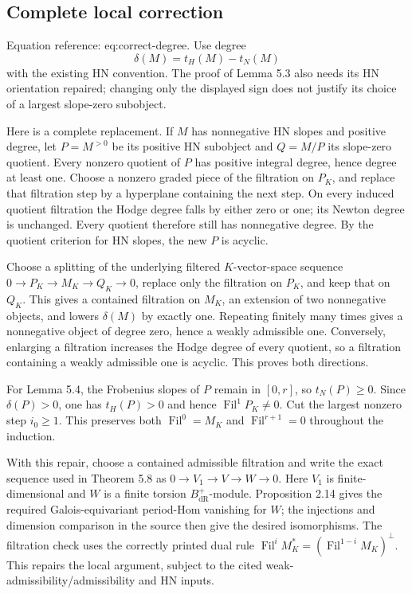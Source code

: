 \documentclass[10pt]{article}
\begin{document}
\subsection*{Complete local correction}
Equation reference: eq:correct-degree. Use degree \[
 \delta(M)=t_H(M)-t_N(M)\] with the existing HN convention. The proof of Lemma 5.3 also needs its HN orientation repaired; changing only the displayed sign does not justify its choice of a largest slope-zero subobject.\par
Here is a complete replacement. If \(M\) has nonnegative HN slopes and positive degree, let \(P=M^{>0}\) be its positive HN subobject and \(Q=M/P\) its slope-zero quotient. Every nonzero quotient of \(P\) has positive integral degree, hence degree at least one. Choose a nonzero graded piece of the filtration on \(P_K\), and replace that filtration step by a hyperplane containing the next step. On every induced quotient filtration the Hodge degree falls by either zero or one; its Newton degree is unchanged. Every quotient therefore still has nonnegative degree. By the quotient criterion for HN slopes, the new \(P\) is acyclic.\par
Choose a splitting of the underlying filtered \(K\)-vector-space sequence \(0\to P_K\to M_K\to Q_K\to0\), replace only the filtration on \(P_K\), and keep that on \(Q_K\). This gives a contained filtration on \(M_K\), an extension of two nonnegative objects, and lowers \(\delta(M)\) by exactly one. Repeating finitely many times gives a nonnegative object of degree zero, hence a weakly admissible one. Conversely, enlarging a filtration increases the Hodge degree of every quotient, so a filtration containing a weakly admissible one is acyclic. This proves both directions.\par
For Lemma 5.4, the Frobenius slopes of \(P\) remain in \([0,r]\), so \(t_N(P)\geq0\). Since \(\delta(P)>0\), one has \(t_H(P)>0\) and hence \(\operatorname{Fil}^1P_K\ne0\). Cut the largest nonzero step \(i_0\geq1\). This preserves both \(\operatorname{Fil}^0=M_K\) and \(\operatorname{Fil}^{r+1}=0\) throughout the induction.\par
With this repair, choose a contained admissible filtration and write the exact sequence used in Theorem 5.8 as \(0\to V_1\to V\to W\to0\). Here \(V_1\) is finite-dimensional and \(W\) is a finite torsion \(B_{\mathrm{dR}}^+\)-module. Proposition 2.14 gives the required Galois-equivariant period-Hom vanishing for \(W\); the injections and dimension comparison in the source then give the desired isomorphisms. The filtration check uses the correctly printed dual rule \(\operatorname{Fil}^iM_K^*=(\operatorname{Fil}^{1-i}M_K)^\perp\). This repairs the local argument, subject to the cited weak-admissibility/admissibility and HN inputs.\par
\end{document}

